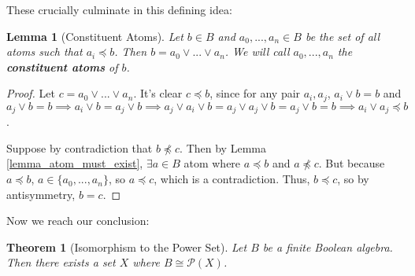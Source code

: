 \documentclass[10pt, letterpaper]{article}
\newcommand{\set}[1]{\{#1\}}
\newcommand{\powerset}[1]{\mathcal{P}(#1)}
\newtheorem{theorem}{Theorem}
\newtheorem{lemma}{Lemma}
\theoremstyle{definition}
\begin{document}
These crucially culminate in this defining idea:
\begin{lemma}[Constituent Atoms]
	Let \(b\in B\) and \(a_0,...,a_n\in B\) be the set of all atoms 
	such that \(a_i\preceq b\). Then \(b=a_0\vee ...\vee a_n\). We will call
	\(a_0,...,a_n\) the \textbf{constituent atoms} of \(b\).
\end{lemma}
\begin{proof}
	Let \(c=a_0\vee ...\vee a_n\). It's clear \(c\preceq b\), since
	for any pair \(a_i, a_j\), \(a_i\vee b = b\) and \(a_j\vee b=b\implies 
	a_i\vee b=a_j\vee b\implies a_j\vee a_i\vee b=a_j\vee a_j\vee b =a_j\vee b= b\implies
	a_i\vee a_j\preceq b\). 

	Suppose by contradiction that \(b\not\preceq c\). 
	Then by Lemma \ref{lemma_atom_must_exist},
	\(\exists a\in B\) atom where \(a\preceq b\) and \(a\not\preceq c\).
	But because \(a\preceq b\), \(a\in\set{a_0,...,a_n}\), so \(a\preceq c\), which
	is a contradiction. Thus, \(b\preceq c\), so by antisymmetry, \(b=c\).
\end{proof}
Now we reach our conclusion:
\begin{theorem}[Isomorphism to the Power Set]
	Let \(B\) be a finite Boolean algebra. Then there exists a set \(X\) where
	\(B\cong\powerset{X}\).
\end{theorem}
\end{document}
